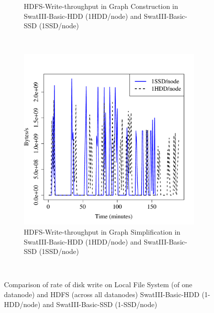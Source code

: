 \documentclass[conference]{IEEEtran}
\begin{document}
\begin{figure}[htb]
\begin{subfigure}[b]{0.23\textwidth}
                \caption{HDFS-Write-throughput in Graph Construction in SwatIII-Basic-HDD (1HDD/node) and SwatIII-Basic-SSD (1SSD/node)}
                \label{fig:BGHddSsdHdfsWrIops}
        \end{subfigure}
        ~ %
        \begin{subfigure}[b]{0.23\textwidth}
                \includegraphics[width=\textwidth]{Figure/SystemData/Plots/ECHddSsdHdfsWrIops.pdf}
                \caption{HDFS-Write-throughput in Graph Simplification in SwatIII-Basic-HDD (1HDD/node) and SwatIII-Basic-SSD (1SSD/node)}
                \label{fig:ECHddSsdHdfsWrIops}
        \end{subfigure}
        ~ %
        \caption{Comparison of rate of disk write on Local File System (of one datanode) and HDFS (across all datanodes) SwatIII-Basic-HDD (1-HDD/node) and SwatIII-Basic-SSD (1-SSD/node)}\label{fig:HddSsdHdfsRWps}   
\end{figure}
\end{document}

